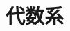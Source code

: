 \documentclass[dvipdfmx]{jsbook}
\theoremstyle{plain}
\newtheorem{Def}[thm]{定義}
\begin{document}
\begin{comment}
************************************
\begin{Def}
集合$X$に関して, 写像$d:X\times X\rightarrow \mathbb{R}$が以下の条件を満たすとき, {\bf $d$は$X$上の距離metricである}という.
\begin{enumerate}
\item 任意の$x,y\in X$について$d(x,y)=0\Leftrightarrow x=y$
\item 任意の$x,y\in X$について$d(x,y)=d(y,x)$
\item 任意の$x,y,z\in X$について$d(x,y)+d(y,z)\geq d(x,z)$
\end{enumerate}
\end{Def}
\begin{Def}
集合$X$と$X$上の距離$d$の組$(X,d)$を{\bf 距離空間 metric space}という
\end{Def}
\begin{Def}
集合$X$の部分集合$U\subset X$と$X$上の距離$d$について, 以下が成り立つとき, {\bf $U\subset X$は開集合である}という.

任意の$x\in U$に対して, とある実数$\epsilon > 0$が存在し, $d(x,y)<\epsilon$を満たす全ての$y\in X$が$y\in U$となる 
\end{Def}
************************************
\end{comment}

\chapter{代数系}
\end{document}
